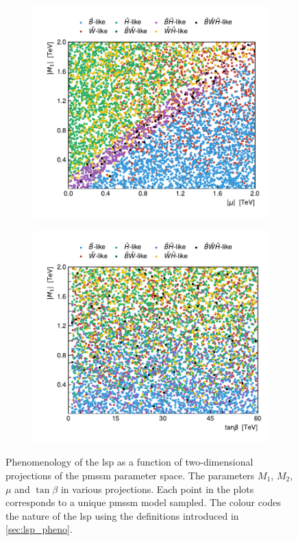 \begin{figure}
\begin{subfigure}[b]{0.5\linewidth}
	\end{subfigure}\hfill
	\begin{subfigure}[b]{0.5\linewidth}
		\centering\includegraphics[width=\textwidth]{scatter/lsp_types_mu_M1}
	\end{subfigure}\hfill
	\begin{subfigure}[b]{0.5\linewidth}
		\centering\includegraphics[width=\textwidth]{scatter/lsp_types_tanb_M1}
	\end{subfigure}\hfill
	\caption{Phenomenology of the \gls{lsp} as a function of two-dimensional projections of the \gls{pmssm} parameter space. The parameters $M_1$, $M_2$, $\mu$ and $\tan\beta$ in various projections. Each point in the plots corresponds to a unique \gls{pmssm} model sampled. The colour codes the nature of the \gls{lsp} using the definitions introduced in \cref{sec:lsp_pheno}.}
	\label{fig:lsp_phenomenology_parameters}
\end{figure}


